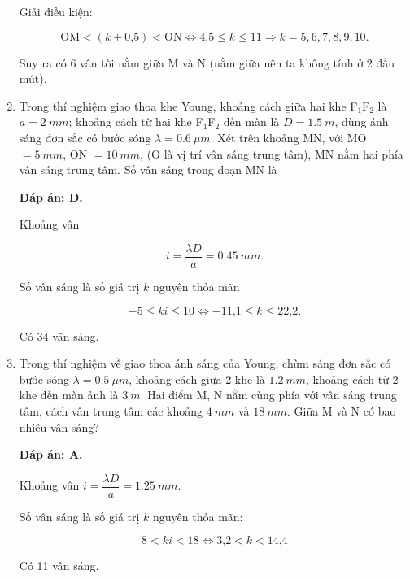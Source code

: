 \begin{enumerate}[label=\bfseries Câu \arabic*:]
{		Giải điều kiện: 
		
		$$\text{OM} < (k+\text{0,5}) < \text{ON} \Leftrightarrow \text{4,5} \leq k \leq 11 \Rightarrow k = 5,6,7,8,9,10.$$
		
		Suy ra có 6 vân tối nằm giữa M và N (nằm giữa nên ta không tính ở 2 đầu mút). 
	}
		\item {} 
	\cauhoi
	{Trong thí nghiệm giao thoa khe Young, khoảng cách giữa hai khe F$_1$F$_2$ là $a = \SI{2}{mm}$; khoảng cách từ hai khe F$_1$F$_2$ đến màn là $D = \SI{1,5}{m}$, dùng ánh sáng đơn sắc có bước sóng  $\lambda = \SI{0,6}{\mu m}$. Xét trên khoảng MN, với MO $= \SI{5}{mm}$, ON $= \SI{10}{mm}$, (O là vị trí vân sáng trung tâm), MN nằm hai phía vân sáng trung tâm. Số vân sáng trong đoạn MN là
		
	}
	
	\loigiai
	{		\textbf{Đáp án: D.}
		
		Khoảng vân 
		
		$$ i  = \dfrac{\lambda D}{a} = \SI{0,45}{mm}.$$
		
		Số vân sáng là số giá trị $k$ nguyên thỏa mãn
		
		$$ - 5 \leq ki \leq 10 \Leftrightarrow - \text{11,1} \leq k \leq \text{22,2}.$$
		
		Có 34 vân sáng.
	}
		\item {} 
	\cauhoi
	{Trong thí nghiệm về giao thoa ánh sáng của Young, chùm sáng đơn sắc có bước sóng  $\lambda= \SI{0,5}{\mu m}$, khoảng cách giữa 2 khe là $\SI{1,2}{mm}$, khoảng cách từ 2 khe đến màn ảnh là $\SI{3}{m}$. Hai điểm M, N nằm cùng phía với vân sáng trung tâm, cách vân trung tâm các khoảng $\SI{4}{mm}$ và $\SI{18}{mm}$. Giữa M và N có bao nhiêu vân sáng?
		
	}
	
	\loigiai
	{		\textbf{Đáp án: A.}
		
		
		Khoảng vân $i = \dfrac{\lambda D}{a} = \SI{1,25}{mm.}$
		
		Số vân sáng là số giá trị $k$ nguyên thỏa mãn:
		
		$$8 <ki<18 \Leftrightarrow \text{3,2} <k <\text{14,4}$$
		
		Có 11 vân sáng.
		
	}
	
\end{enumerate}






